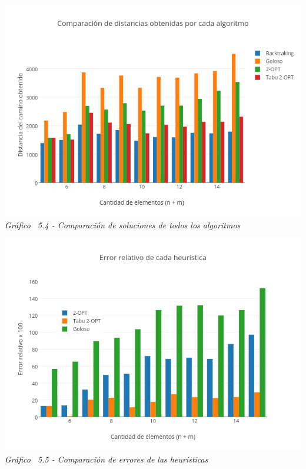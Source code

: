 \vspace*{0.3cm} \vspace*{0.3cm}
  \begin{center}
 \includegraphics[scale=0.5]{./EJ5/comparativo.png}\\
 {\textit{Gráfico \ 5.4 - Comparaci\'on de soluciones de todos los algoritmos}}
  \end{center}
  \vspace*{0.3cm}
  
  \vspace*{0.3cm} \vspace*{0.3cm}
  \begin{center}
 \includegraphics[scale=0.5]{./EJ5/errorChico.png}\\
 {\textit{Gráfico \ 5.5 - Comparaci\'on de errores de las heurísticas}}
  \end{center}
  \vspace*{0.3cm}
  
